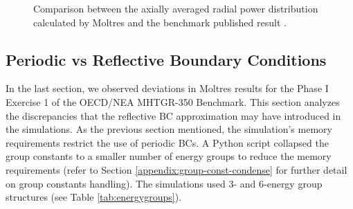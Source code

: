 \begin{figure}[htbp!]
	\centering
	\hfill
  \caption{Comparison between the axially averaged radial power distribution calculated by Moltres and the benchmark published result \cite{oecd_nea_coupled_2020}.}
  \label{fig:radialpower}
\end{figure}

\subsection{Periodic vs Reflective Boundary Conditions}
\label{sec:bench-bcs}

In the last section, we observed deviations in Moltres results for the Phase I Exercise 1 of the OECD/NEA MHTGR-350 Benchmark.
This section analyzes the discrepancies that the reflective \gls{BC} approximation may have introduced in the simulations.
As the previous section mentioned, the simulation's memory requirements restrict the use of periodic BCs.
A Python script collapsed the group constants to a smaller number of energy groups to reduce the memory requirements (refer to Section \ref{appendix:group-const-condense} for further detail on group constants handling).
The simulations used 3- and 6-energy group structures (see Table \ref{tab:energygroups}).

